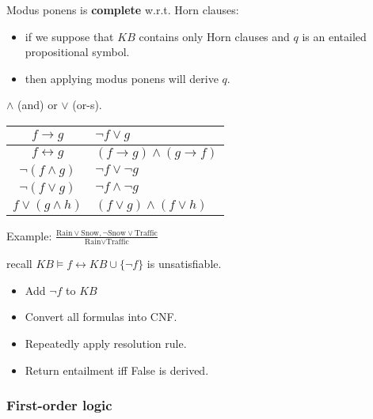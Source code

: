Modus ponens is \textbf{complete} w.r.t. Horn clauses:
\begin{itemize}
    \item if we suppose that $KB$ contains only Horn clauses and $q$ is an entailed propositional symbol.
    \item then applying modus ponens will derive $q$.
\end{itemize}

 $\wedge$ (and) or $\vee$ (or-s).

\begin{tabular}{c|l}
    \hline
    $f \rightarrow g$ & $\neg f \vee g$ \\ 
    \hline
    $f \leftrightarrow g$ & $(f \rightarrow g) \wedge (g \rightarrow f)$ \\ 
    \hline
    $\neg (f \wedge g)$ & $\neg f \vee \neg g$\\
    \hline
    $\neg (f \vee g)$ & $\neg f \wedge \neg g$\\
    \hline
    $f \vee (g \wedge h)$ & $(f \vee g) \wedge (f \vee h)$\\
    \hline
\end{tabular}


 
Example: $\frac{\text{Rain} \vee \text{Snow}, \neg \text{Snow} \vee \text{Traffic}}
{\text{Rain} \vee \text{Traffic}}$

 recall $KB \models f \leftrightarrow KB \cup \{\neg f\}$ is unsatisfiable.
\begin{itemize}
    \item Add $\neg f$ to $KB$
    \item Convert all formulas into CNF.
    \item Repeatedly apply resolution rule.
    \item Return entailment iff False is derived.
\end{itemize}

\subsubsection{First-order logic}

